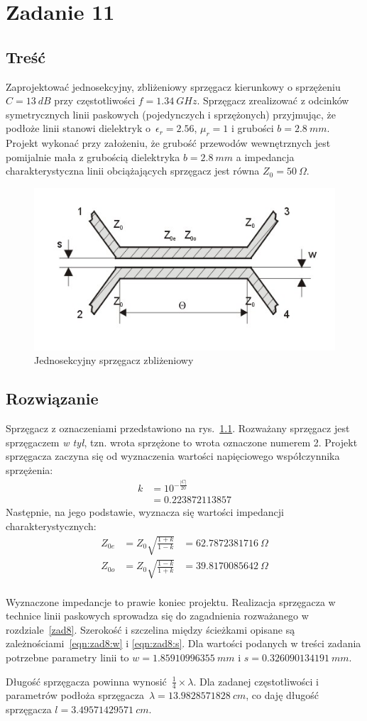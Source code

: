 \documentclass[rep.tex]{subfiles}
\begin{document}
\chapter{Zadanie 11}
\label{zad11}
\section{Treść}
Zaprojektować jednosekcyjny, zbliżeniowy sprzęgacz kierunkowy o sprzężeniu $C = 13~dB$ przy częstotliwości $f = 1.34~GHz$.
Sprzęgacz zrealizować z odcinków symetrycznych linii paskowych (pojedynczych i sprzężonych) przyjmując,
że podłoże linii stanowi dielektryk o~$\epsilon_r = 2.56$, $\mu_r = 1$ i grubości $b = 2.8~mm$.
Projekt wykonać przy założeniu, że grubość przewodów wewnętrznych jest pomijalnie mała z grubością dielektryka $b = 2.8~mm$
a impedancja charakterystyczna linii obciążających sprzęgacz jest równa $Z_0 = 50~\Omega$.

\begin{figure}[!htbp]
  \centering
  \includegraphics[width=0.5\linewidth]{fig/zad11/coupler}
  \caption{Jednosekcyjny sprzęgacz zbliżeniowy}
  \label{fig:zad11:coupler}
\end{figure}

\section{Rozwiązanie}
Sprzęgacz z oznaczeniami przedstawiono na rys.~\ref{fig:zad11:coupler}.
Rozważany sprzęgacz jest sprzęgaczem \emph{w tył}, tzn. wrota sprzężone to wrota oznaczone numerem 2.
Projekt sprzęgacza zaczyna się od wyznaczenia wartości napięciowego współczynnika sprzężenia:
\begin{align}
  k &= 10^{-\frac{|C|}{20}} \label{eqn:zad11:k} \\
  &= 0.223872113857 \nonumber
\end{align}
Następnie, na jego podstawie, wyznacza się wartości impedancji charakterystycznych:
\begin{align}
  Z_{0e} &= Z_0\sqrt{\frac{1 + k}{1 - k}} &= 62.7872381716~\Omega \\
  Z_{0o} &= Z_0\sqrt{\frac{1 - k}{1 + k}} &= 39.8170085642~\Omega \\
\end{align}

Wyznaczone impedancje to prawie koniec projektu.
Realizacja sprzęgacza w technice linii paskowych sprowadza się do zagadnienia rozważanego w rozdziale~\ref{zad8}.
Szerokość i szczelina między ścieżkami opisane są zależnościami~\ref{eqn:zad8:w} i \ref{eqn:zad8:s}.
Dla wartości podanych w treści zadania potrzebne parametry linii to $w = 1.85910996355~mm$ i $s = 0.326090134191~mm$.  

Długość sprzęgacza powinna wynosić~$\frac{1}{4}\times\lambda$.
Dla zadanej częstotliwości i parametrów podłoża sprzęgacza~$\lambda = 13.9828571828~cm$, co daję długość sprzęgacza $l = 3.49571429571~cm$.
\end{document}
